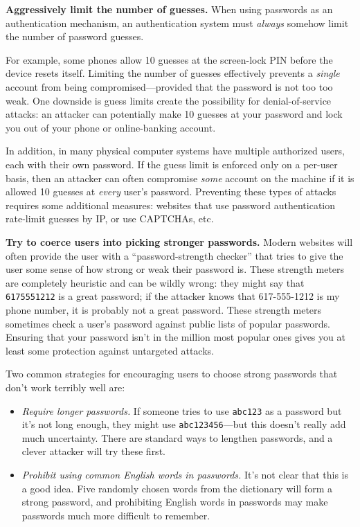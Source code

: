 \documentclass[
  letterpaper,
]{scrbook}
\providecommand{\tightlist}{%
  \setlength{\itemsep}{0pt}\setlength{\parskip}{0pt}}
\theoremstyle{definition}
\theoremstyle{plain}
\theoremstyle{plain}
\theoremstyle{remark}
\begin{document}
\textbf{Aggressively limit the number of guesses.} When using passwords
as an authentication mechanism, an authentication system must
\emph{always} somehow limit the number of password guesses.

For example, some phones allow 10 guesses at the screen-lock PIN before
the device resets itself. Limiting the number of guesses effectively
prevents a \emph{single} account from being compromised---provided that
the password is not too too weak. One downside is guess limits create
the possibility for denial-of-service attacks: an attacker can
potentially make 10 guesses at your password and lock you out of your
phone or online-banking account.

In addition, in many physical computer systems have multiple authorized
users, each with their own password. If the guess limit is enforced only
on a per-user basis, then an attacker can often compromise \emph{some}
account on the machine if it is allowed 10 guesses at \emph{every}
user's password. Preventing these types of attacks requires some
additional measures: websites that use password authentication
rate-limit guesses by IP, or use CAPTCHAs, etc.

\textbf{Try to coerce users into picking stronger passwords.} Modern
websites will often provide the user with a ``password-strength
checker'' that tries to give the user some sense of how strong or weak
their password is. These strength meters are completely heuristic and
can be wildly wrong: they might say that \texttt{6175551212} is a great
password; if the attacker knows that 617-555-1212 is my phone number, it
is probably not a great password. These strength meters sometimes check
a user's password against public lists of popular passwords. Ensuring
that your password isn't in the million most popular ones gives you at
least some protection against untargeted attacks.

Two common strategies for encouraging users to choose strong passwords
that don't work terribly well are:

\begin{itemize}
\tightlist
\item
  \emph{Require longer passwords.} If someone tries to use
  \texttt{abc123} as a password but it's not long enough, they might use
  \texttt{abc123456}---but this doesn't really add much uncertainty.
  There are standard ways to lengthen passwords, and a clever attacker
  will try these first.
\item
  \emph{Prohibit using common English words in passwords.} It's not
  clear that this is a good idea. Five randomly chosen words from the
  dictionary will form a strong password, and prohibiting English words
  in passwords may make passwords much more difficult to remember.
\end{itemize}
\end{document}
